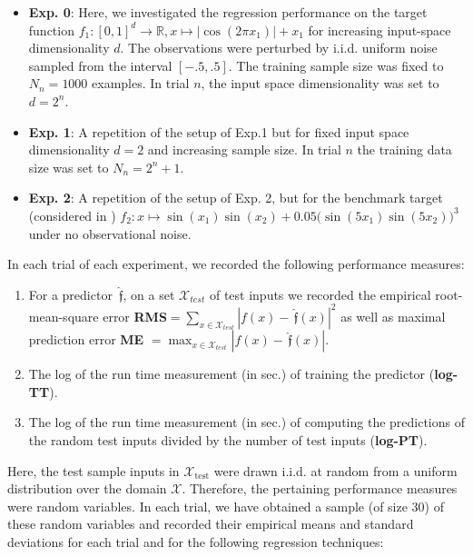 \documentclass{article} %
\theoremstyle{definition}
\theoremstyle{remark}
\newcommand{\abs}[1]{\left\vert#1\right\vert}
\newcommand{\Real}{\mathbb R}
\newcommand{\inspace}{\ensuremath{ \mathcal X}}
\newcommand{\predf}{\, \mathfrak{  \hat f}} %
\begin{document}
\begin{itemize}
\item \textbf{Exp. 0}: Here, we investigated the regression performance on the target function $f_1: [0,1]^d \to \Real, x \mapsto \abs{\cos(2\pi x_1)}+x_1$ for increasing input-space dimensionality $d$. The observations were perturbed by i.i.d. uniform noise sampled from the interval $[-.5,.5]$.  The training sample size was fixed to $N_n = 1000$ examples. In trial $n$, the input space dimensionality was set to $d=2^n$.
\item \textbf{Exp. 1}: 
A repetition of the setup of Exp.1 but for fixed input space dimensionality $d=2$ and increasing sample size. 
In trial $n$ the training data size was set to $N_n = 2^n+1$.
\item \textbf{Exp. 2}: A repetition of the setup of Exp. 2, but for the benchmark target (considered in \cite{Beliakov2006}) $f_2: x \mapsto \sin(x_1) \sin(x_2)+0.05 \bigl(\sin(5x_1) \sin(5 x_2)\bigr)^3$ under no observational noise.
\end{itemize}
%
%
In each trial of each experiment, we recorded the following performance measures:
%
\begin{enumerate}
	\item  For a predictor $\predf$, on a set $\inspace_{test}$ of test inputs we recorded the empirical root-mean-square error \textbf{RMS}$ =  \sum_{x \in \inspace_{test}} \abs{f(x) -\predf(x)}^2 $ \newline as well as  maximal prediction error 
	 \textbf{ME} $= \max_{x \in \inspace_{test}} \abs{f(x) -\predf(x)}$.
	\item The log of the run time measurement (in sec.) of training the predictor (\textbf{log-TT}).
	\item The log of the run time measurement (in sec.) of computing the predictions of the random test inputs divided by the number of test inputs (\textbf{log-PT}). 
\end{enumerate}
%
%
Here, the test sample inputs in $\inspace_{\text{test}}$ were drawn i.i.d. at random from a uniform distribution over the domain $\inspace$.
Therefore, the pertaining performance measures were random variables. In each trial, we have obtained a sample (of size 30) of these random variables and recorded their empirical means and standard deviations for each trial and for the following regression techniques:
\end{document}

